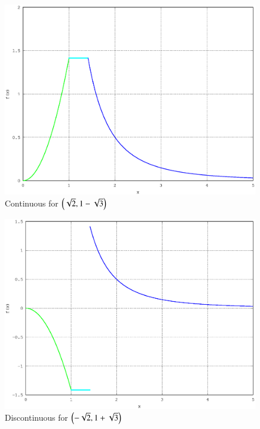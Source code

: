 \documentclass[journal,12pt,twocolumn]{IEEEtran}
\begin{document}
\renewcommand{\thefigure}{\theproblem.\arabic{figure}}
\begin{figure}[h]
\centering
\includegraphics[width=\columnwidth]{./version_2/ee16b1019/ee16b1019a}
\caption{ Continuous for $\left(\sqrt{2}, 1 - \sqrt{3}\right)$}
\end{figure}
%
\begin{figure}[h]
\centering
\includegraphics[width=\columnwidth]{./version_2/ee16b1019/ee16b1019b}
\caption{ Discontinuous for $\left(-\sqrt{2}, 1 + \sqrt{3}\right)$}
\end{figure}
%
\end{document}
